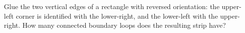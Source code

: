 Glue the two vertical edges of a rectangle with reversed orientation: the upper-left corner is identified with the lower-right, and the lower-left with the upper-right. How many connected boundary loops does the resulting strip have?
